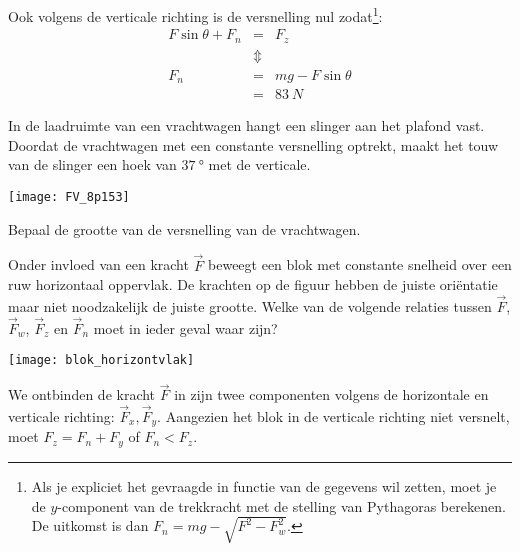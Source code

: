 \documentclass{ximera}
\begin{document}
\begin{exercise}
\begin{oplossing}
	Ook volgens de verticale richting is de versnelling nul zodat\footnote{Als je expliciet het gevraagde in functie van de gegevens wil zetten, moet je de $y$-component van de trekkracht met de stelling van Pythagoras berekenen. De uitkomst is dan $F_n=mg-\sqrt{F^2-F_w^2}$.}:
	\begin{eqnarray*}
		F\sin{\theta}+F_n&=&F_z\\
		&\Updownarrow&\\
		F_n &=& mg-F\sin{\theta}\\
		&=& \SI{83}{N}
	\end{eqnarray*}
	\end{oplossing}
\end{exercise}

\begin{exercise}
	In de laadruimte van een vrachtwagen hangt een slinger aan het plafond vast. Doordat de vrachtwagen met een constante versnelling optrekt, maakt het touw van de slinger een hoek van $\SI{37}{\degree}$ met de verticale. 
	
	\begin{image}
		\texttt{[image: FV\_8p153]}
	\end{image}
	
	Bepaal de grootte van de versnelling van de vrachtwagen.
\end{exercise}

\begin{exercise}
	Onder invloed van een kracht $\vec{F}$ beweegt een blok met constante snelheid over een ruw horizontaal oppervlak. De krachten op de figuur hebben de juiste ori\"entatie maar niet noodzakelijk de juiste grootte. Welke van de volgende relaties tussen $\vec{F}$, $\vec{F}_w$, $\vec{F}_z$ en $\vec{F}_n$ moet in ieder geval waar zijn?

	\begin{minipage}{0.6\textwidth}
	\begin{multipleChoice}
	\end{multipleChoice}
	\end{minipage}
	\hfill
	\begin{minipage}{0.35\textwidth}
	\begin{image}
			\texttt{[image: blok\_horizontvlak]}
	\end{image}
	\end{minipage}

	\begin{oplossing}
	We ontbinden de kracht $\vec{F}$ in zijn twee componenten volgens de horizontale en verticale richting: $\vec{F}_x,\vec{F}_y$. Aangezien het blok in de verticale richting niet versnelt, moet $F_z=F_n+F_y$ of $F_n<F_z$.
	\end{oplossing}
\end{exercise}
\end{document}
